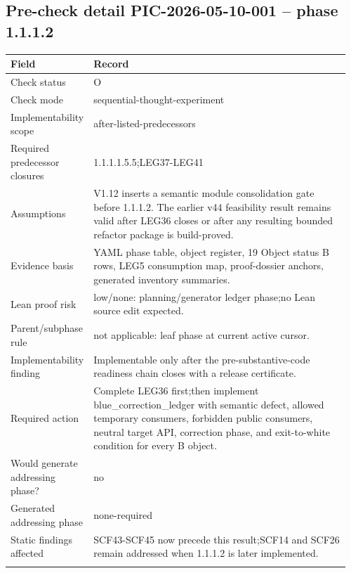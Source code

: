\small
{}
\subsection*{Pre-check detail PIC-2026-05-10-001 -- phase 1.1.1.2}
\begin{longtable}{L{0.18\linewidth} L{0.78\linewidth}}
\hline
\textbf{Field} & \textbf{Record}\\
\hline
Check status & O\\
\hline\addlinespace[0.20em]
Check mode & sequential-thought-experiment\\
\hline\addlinespace[0.20em]
Implementability scope & after-listed-predecessors\\
\hline\addlinespace[0.20em]
Required predecessor closures & 1.1.1.1.5.5;\newline LEG37-LEG41\\
\hline\addlinespace[0.20em]
Assumptions & V1.12 inserts a semantic module consolidation gate before 1.1.1.2. The earlier v44 feasibility result remains valid after LEG36 closes or after any resulting bounded refactor package is build-proved.\\
\hline\addlinespace[0.20em]
Evidence basis & YAML phase table, object register, 19 Object status B rows, LEG5 consumption map, proof-dossier anchors, generated inventory summaries.\\
\hline\addlinespace[0.20em]
Lean proof risk & low/\allowbreak{}none: planning/\allowbreak{}generator ledger phase;\newline no Lean source edit expected.\\
\hline\addlinespace[0.20em]
Parent/\allowbreak{}subphase rule & not applicable: leaf phase at current active cursor.\\
\hline\addlinespace[0.20em]
Implementability finding & Implementable only after the pre-substantive-code readiness chain closes with a release certificate.\\
\hline\addlinespace[0.20em]
Required action & Complete LEG36 first;\newline then implement blue\_correction\_ledger with semantic defect, allowed temporary consumers, forbidden public consumers, neutral target API, correction phase, and exit-to-white condition for every B object.\\
\hline\addlinespace[0.20em]
Would generate addressing phase? & no\\
\hline\addlinespace[0.20em]
Generated addressing phase & none-required\\
\hline\addlinespace[0.20em]
Static findings affected & SCF43-SCF45 now precede this result;\newline SCF14 and SCF26 remain addressed when 1.1.1.2 is later implemented.\\
\hline\addlinespace[0.20em]
\end{longtable}
